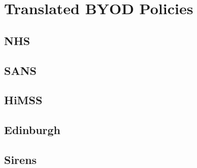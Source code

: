 \documentclass[phd,lfcs,notimes,openright]{infthesis}
\begin{document}









\appendix
\chapter{Translated BYOD Policies}
\label{appendix:byod}
\section{NHS}

\section{SANS}

\section{HiMSS}

\section{Edinburgh}

\section{Sirens}




%
\singlespace


\end{document}
